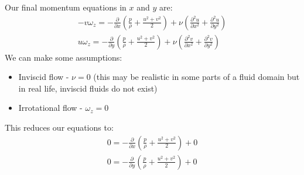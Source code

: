\documentclass[class=report, crop=false, 12pt,a4paper]{standalone}
\begin{document}
Our final momentum equations in $x$ and $y$ are: 
\begin{gather}
  -v \omega_z = - \frac{\partial}{\partial x} \left( \frac{p}{\rho} + \frac{u^2 + v^2}{2} \right) + \nu \left( \frac{\partial^2 u}{\partial x^2} + \frac{\partial^2 u}{\partial y^2} \right)\\
  u \omega_z = - \frac{\partial}{\partial y} \left( \frac{p}{\rho} + \frac{u^2 + v^2}{2} \right) + \nu \left( \frac{\partial^2 v}{\partial x^2} + \frac{\partial^2 v}{\partial y^2} \right)
\end{gather}
We can make some assumptions:
\begin{itemize}
  \item Inviscid flow - $\nu = 0$ (this may be realistic in some parts of a fluid domain but in real life, inviscid fluids do not exist)
  \item Irrotational flow - $\omega_z = 0$
\end{itemize}
This reduces our equations to:
\begin{gather}
  0 = - \frac{\partial}{\partial x} \left( \frac{p}{\rho} + \frac{u^2 + v^2}{2} \right) + 0\\
  0 = - \frac{\partial}{\partial y} \left( \frac{p}{\rho} + \frac{u^2 + v^2}{2} \right) + 0
\end{gather}
\end{document}
